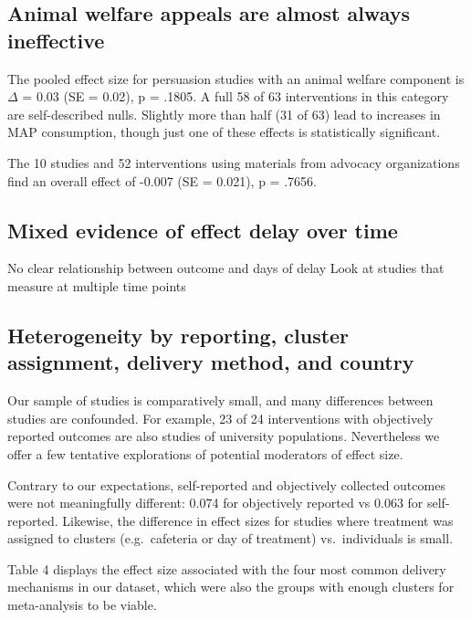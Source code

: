 \documentclass[sn-nature,pdflatex]{sn-jnl}
\begin{document}
\subsection{Animal welfare appeals are almost always
ineffective}\label{sec2.8}

The pooled effect size for persuasion studies with an animal welfare
component is \(\Delta\) = 0.03 (SE = 0.02), p = .1805. A full 58 of 63
interventions in this category are self-described nulls. Slightly more
than half (31 of 63) lead to increases in MAP consumption, though just
one of these effects is statistically significant.

The 10 studies and 52 interventions using materials from advocacy
organizations find an overall effect of -0.007 (SE = 0.021), p = .7656.

\subsection{Mixed evidence of effect delay over
time}\label{mixed-evidence-of-effect-delay-over-time}

No clear relationship between outcome and days of delay Look at studies
that measure at multiple time points

\subsection{Heterogeneity by reporting, cluster assignment, delivery
method, and country}\label{sec2.10}

Our sample of studies is comparatively small, and many differences
between studies are confounded. For example, 23 of 24 interventions with
objectively reported outcomes are also studies of university
populations. Nevertheless we offer a few tentative explorations of
potential moderators of effect size.

Contrary to our expectations, self-reported and objectively collected
outcomes were not meaningfully different: 0.074 for objectively reported
vs 0.063 for self-reported. Likewise, the difference in effect sizes for
studies where treatment was assigned to clusters (e.g.~cafeteria or day
of treatment) vs.~individuals is small.

Table 4 displays the effect size associated with the four most common
delivery mechanisms in our dataset, which were also the groups with
enough clusters for meta-analysis to be viable.
\end{document}
